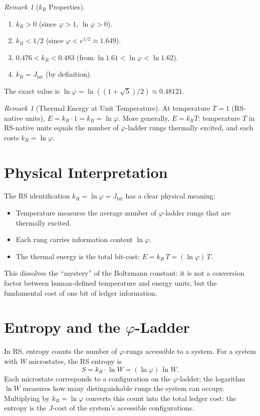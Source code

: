 \documentclass[12pt,a4paper]{article}
\theoremstyle{definition}
\theoremstyle{remark}
\newtheorem{remark}[theorem]{Remark}
\begin{document}
\begin{remark}[$k_R$ Properties]
\begin{enumerate}
  \item $k_R > 0$ (since $\varphi > 1$, $\ln\varphi > 0$).
  \item $k_R < 1/2$ (since $\varphi < e^{1/2} \approx 1.649$).
  \item $0.476 < k_R < 0.483$ (from $\ln 1.61 < \ln\varphi < \ln 1.62$).
  \item $k_R = J_{\mathrm{bit}}$ (by definition).
\end{enumerate}
The exact value is $\ln\varphi = \ln((1+\sqrt{5})/2) \approx 0.48121$.
\end{remark}

\begin{remark}[Thermal Energy at Unit Temperature]
At temperature $T = 1$ (RS-native units), $E = k_R \cdot 1 = k_R = \ln\varphi$.
More generally, $E = k_R T$: temperature $T$ in RS-native units equals
the number of $\varphi$-ladder rungs thermally excited, and each costs
$k_R = \ln\varphi$.
\end{remark}

\section{Physical Interpretation}

The RS identification $k_R = \ln\varphi = J_{\mathrm{bit}}$ has a
clear physical meaning:
\begin{itemize}
  \item Temperature measures the average number of $\varphi$-ladder
  rungs that are thermally excited.
  \item Each rung carries information content $\ln\varphi$.
  \item The thermal energy is the total bit-cost: $E = k_R\,T =
  (\ln\varphi)\,T$.
\end{itemize}

This dissolves the ``mystery'' of the Boltzmann constant: it is not
a conversion factor between human-defined temperature and energy
units, but the fundamental cost of one bit of ledger information.

\section{Entropy and the $\varphi$-Ladder}

In RS, entropy counts the number of $\varphi$-rungs accessible to a
system.  For a system with $W$ microstates, the RS entropy is
\begin{equation}
  S = k_R \cdot \ln W = (\ln\varphi)\,\ln W.
\end{equation}
Each microstate corresponds to a configuration on the
$\varphi$-ladder; the logarithm $\ln W$ measures how many
distinguishable rungs the system can occupy.  Multiplying by $k_R =
\ln\varphi$ converts this count into the total ledger cost: the
entropy is the $J$-cost of the system's accessible configurations.
\end{document}
